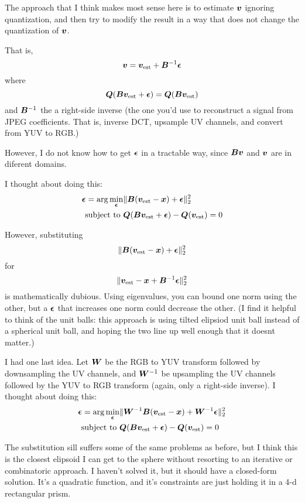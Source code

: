 \documentclass{article}
\begin{document}
The approach that I think makes most sense here is to estimate $\bm{v}$ ignoring quantization, and then try to modify the result in a way that does not change the quantization of $\bm{v}$.

That is,
\begin{equation}
\bm{v} = \bm{v}_{\text{est}} + \bm{B}^{-1}\bm{\epsilon}
\end{equation}
where
\begin{equation}
\bm{Q}(\bm{B}\bm{v}_\text{est} + \bm{\epsilon}) = \bm{Q}(\bm{B}\bm{v}_\text{est})
\end{equation}
and $\bm{B}^{-1}$ the a right-side inverse (the one you'd use to reconstruct a signal from JPEG coefficients. That is, inverse DCT, upsample UV channels, and convert from YUV to RGB.)

However, I do not know how to get $\bm{\epsilon}$ in a tractable way, since $\bm{B}\bm{v}$ and $\bm{v}$ are in diferent domains.

I thought about doing this:
\begin{equation}
\begin{aligned}
\bm{\epsilon} = \arg\min_{\bm{\epsilon}} & \|\bm{B}(\bm{v}_{\text{est}} - \bm{x}) + \bm{\epsilon}\|_2^2 \\
\text{subject to } & \bm{Q}(\bm{B}\bm{v}_{\text{est}} + \bm{\epsilon}) - \bm{Q}(\bm{v}_{\text{est}}) = 0 \\
\end{aligned}
\end{equation}

However, substituting
\begin{equation}
\|\bm{B}(\bm{v}_{\text{est}} - \bm{x}) + \bm{\epsilon}\|_2^2
\end{equation}
for
\begin{equation}
\|\bm{v}_{\text{est}} - \bm{x} + \bm{B}^{-1}\bm{\epsilon}\|_2^2
\end{equation}
is mathematically dubious. Using eigenvalues, you can bound one norm using the other, but a $\bm{\epsilon}$ that increases one norm could decrease the other.  (I find it helpful to think of the unit balls: this approach is using tilted elipsiod unit ball instead of a spherical unit ball, and hoping the two line up well enough that it doesnt matter.)

I had one last idea. Let $\bm{W}$ be the RGB to YUV transform followed by downsampling the UV channels, and $\bm{W}^{-1}$ be upsampling the UV channels followed by the YUV to RGB transform (again, only a right-side inverse).
I thought about doing this:
\begin{equation}
\begin{aligned}
\bm{\epsilon} = \arg\min_{\bm{\epsilon}} & \|\bm{W}^{-1}\bm{B}(\bm{v}_{\text{est}} - \bm{x}) + \bm{W}^{-1}\bm{\epsilon}\|_2^2 \\
\text{subject to } & \bm{Q}(\bm{B}\bm{v}_{\text{est}} + \bm{\epsilon}) - \bm{Q}(\bm{v}_{\text{est}}) = 0 \\
\end{aligned}
\end{equation}

The substitution sill suffers some of the same problems as before, but I think this is the closest elipsoid I can get to the sphere without resorting to an iterative or combinatoric approach. I haven't solved it, but it should have a closed-form solution. It's a quadratic function, and it's constraints are just holding it in a 4-d rectangular prism.
\end{document}

